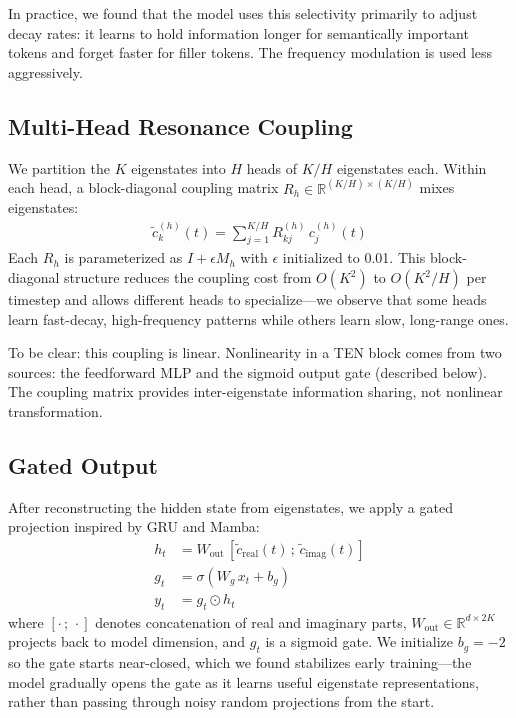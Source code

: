 \documentclass{article}
\begin{document}
In practice, we found that the model uses this selectivity primarily to adjust decay rates: it learns to hold information longer for semantically important tokens and forget faster for filler tokens. The frequency modulation is used less aggressively.

\subsection{Multi-Head Resonance Coupling}

We partition the $K$ eigenstates into $H$ heads of $K/H$ eigenstates each. Within each head, a block-diagonal coupling matrix $R_h \in \mathbb{R}^{(K/H) \times (K/H)}$ mixes eigenstates:
\begin{align}
\tilde{c}^{(h)}_k(t) = \sum_{j=1}^{K/H} R^{(h)}_{kj} \, c^{(h)}_j(t)
\end{align}
Each $R_h$ is parameterized as $I + \epsilon M_h$ with $\epsilon$ initialized to 0.01. This block-diagonal structure reduces the coupling cost from $O(K^2)$ to $O(K^2/H)$ per timestep and allows different heads to specialize---we observe that some heads learn fast-decay, high-frequency patterns while others learn slow, long-range ones.

To be clear: this coupling is linear. Nonlinearity in a TEN block comes from two sources: the feedforward MLP and the sigmoid output gate (described below). The coupling matrix provides inter-eigenstate information sharing, not nonlinear transformation.

\subsection{Gated Output}

After reconstructing the hidden state from eigenstates, we apply a gated projection inspired by GRU and Mamba:
\begin{align}
h_t &= W_{\text{out}} \, [\tilde{c}_{\text{real}}(t) \,;\, \tilde{c}_{\text{imag}}(t)] \\
g_t &= \sigma(W_g \, x_t + b_g) \\
y_t &= g_t \odot h_t
\end{align}
where $[\cdot \,;\, \cdot]$ denotes concatenation of real and imaginary parts, $W_{\text{out}} \in \mathbb{R}^{d \times 2K}$ projects back to model dimension, and $g_t$ is a sigmoid gate. We initialize $b_g = -2$ so the gate starts near-closed, which we found stabilizes early training---the model gradually opens the gate as it learns useful eigenstate representations, rather than passing through noisy random projections from the start.
\end{document}
